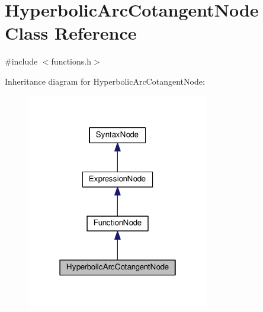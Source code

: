 \hypertarget{classHyperbolicArcCotangentNode}{}\section{Hyperbolic\+Arc\+Cotangent\+Node Class Reference}
\label{classHyperbolicArcCotangentNode}


{\ttfamily \#include $<$functions.\+h$>$}



Inheritance diagram for Hyperbolic\+Arc\+Cotangent\+Node\+:
\nopagebreak
\begin{figure}[H]
\begin{center}
\leavevmode
\includegraphics[width=226pt]{d6/d8f/classHyperbolicArcCotangentNode__inherit__graph}
\end{center}
\end{figure}


